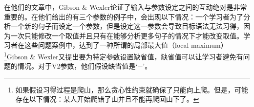 在他们的文章中，Gibson \& Wexler论证了输入与参数设定之间的互动绝对是非常重要的。在他们给出的有三个参数的例子中，会出现以下情况：一个学习者为了分析一个新的句子而设定一个参数，但是设定这一参数会导致目标语法无法习得，因为一次只能修改一个取值并且只有在能够分析更多句子的情况下才能改变取值。学习者在这些问题案例中，达到了一种所谓的局部最大值（local maximum）\footnote{%
如果假设习得过程是爬山，那么贪心性约束就确保了只能向上爬。但是，可能存在以下情况：某人开始爬错了山并且不能再爬回山下了。 
}Gibson \& Wexler又提出要为特定参数设置缺省值，缺省值可以让学习者避免有问题的情况。对于V2参数，他们假设缺省值是`$-$'。

